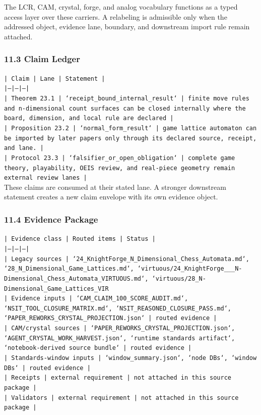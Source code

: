 \documentclass[11pt]{article}
\begin{document}
The LCR, CAM, crystal, forge, and analog vocabulary functions as a typed access
layer over these carriers. A relabeling is admissible only when the addressed
object, evidence lane, boundary, and downstream import rule remain attached.

\subsubsection*{11.3 Claim Ledger}

\noindent\texttt{| Claim | Lane | Statement |}\\
\noindent\texttt{|---|---|---|}\\
\noindent\texttt{| Theorem 23.1 | `receipt\_bound\_internal\_result` | finite move rules and n-dimensional count surfaces can be closed internally where the board, dimension, and local rule are declared |}\\
\noindent\texttt{| Proposition 23.2 | `normal\_form\_result` | game lattice automaton can be imported by later papers only through its declared source, receipt, and lane. |}\\
\noindent\texttt{| Protocol 23.3 | `falsifier\_or\_open\_obligation` | complete game theory, playability, OEIS review, and real-piece geometry remain external review lanes |}\\

These claims are consumed at their stated lane. A stronger downstream statement
creates a new claim envelope with its own evidence object.

\subsubsection*{11.4 Evidence Package}

\noindent\texttt{| Evidence class | Routed items | Status |}\\
\noindent\texttt{|---|---|---|}\\
\noindent\texttt{| Legacy sources | `24\_KnightForge\_N\_Dimensional\_Chess\_Automata.md`, `28\_N\_Dimensional\_Game\_Lattices.md`, `virtuous/24\_KnightForge\_\_\_N-Dimensional\_Chess\_Automata\_VIRTUOUS.md`, `virtuous/28\_N-Dimensional\_Game\_Lattices\_VIR}\\
\noindent\texttt{| Evidence inputs | `CAM\_CLAIM\_100\_SCORE\_AUDIT.md`, `NSIT\_TOOL\_CLOSURE\_MATRIX.md`, `NSIT\_REASONED\_CLOSURE\_PASS.md`, `PAPER\_REWORKS\_CRYSTAL\_PROJECTION.json` | routed evidence |}\\
\noindent\texttt{| CAM/crystal sources | `PAPER\_REWORKS\_CRYSTAL\_PROJECTION.json`, `AGENT\_CRYSTAL\_WORK\_HARVEST.json`, `runtime standards artifact`, `notebook-derived source bundle` | routed evidence |}\\
\noindent\texttt{| Standards-window inputs | `window\_summary.json`, `node DBs`, `window DBs` | routed evidence |}\\
\noindent\texttt{| Receipts | external requirement | not attached in this source package |}\\
\noindent\texttt{| Validators | external requirement | not attached in this source package |}\\
\end{document}
